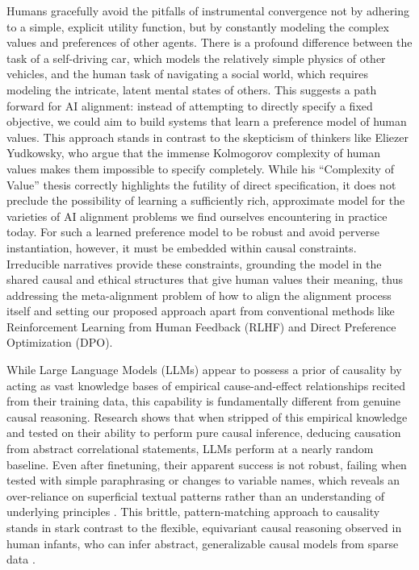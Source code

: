\documentclass{article}
\theoremstyle{plain}
\theoremstyle{definition}
\theoremstyle{remark}
\begin{document}
Humans gracefully avoid the pitfalls of instrumental convergence not by adhering to a simple, explicit utility function, but by constantly modeling the complex values and preferences of other agents. There is a profound difference between the task of a self-driving car, which models the relatively simple physics of other vehicles, and the human task of navigating a social world, which requires modeling the intricate, latent mental states of others. This suggests a path forward for AI alignment: instead of attempting to directly specify a fixed objective, we could aim to build systems that learn a preference model of human values. This approach stands in contrast to the skepticism of thinkers like Eliezer Yudkowsky, who argue that the immense Kolmogorov complexity of human values makes them impossible to specify completely. While his ``Complexity of Value'' thesis correctly highlights the futility of direct specification, it does not preclude the possibility of learning a sufficiently rich, approximate model for the varieties of AI alignment problems we find ourselves encountering in practice today. For such a learned preference model to be robust and avoid perverse instantiation, however, it must be embedded within causal constraints. Irreducible narratives provide these constraints, grounding the model in the shared causal and ethical structures that give human values their meaning, thus addressing the meta-alignment problem of how to align the alignment process itself and setting our proposed approach apart from conventional methods like Reinforcement Learning from Human Feedback (RLHF) and Direct Preference Optimization (DPO).

While Large Language Models (LLMs) appear to possess a prior of causality by acting as vast knowledge bases of empirical cause-and-effect relationships recited from their training data, this capability is fundamentally different from genuine causal reasoning. Research shows that when stripped of this empirical knowledge and tested on their ability to perform pure causal inference, deducing causation from abstract correlational statements, LLMs perform at a nearly random baseline. Even after finetuning, their apparent success is not robust, failing when tested with simple paraphrasing or changes to variable names, which reveals an over-reliance on superficial textual patterns rather than an understanding of underlying principles \cite{jin23}. This brittle, pattern-matching approach to causality stands in stark contrast to the flexible, equivariant causal reasoning observed in human infants, who can infer abstract, generalizable causal models from sparse data \cite{gopnik02}.
\end{document}
